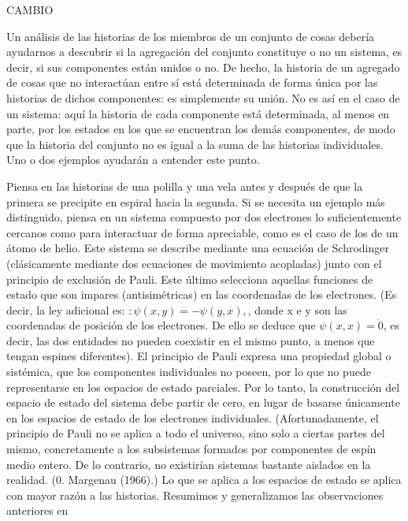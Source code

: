 \begin{justifying}
    \pagebreak

    \begin{center}
        CAMBIO
    \end{center}

    Un análisis de las historias de los miembros de un conjunto de cosas debería
    ayudarnos a descubrir si la agregación del conjunto constituye o no un
    sistema, es decir, si sus componentes están unidos o no. De hecho, la
    historia de un agregado de cosas que no interactúan entre sí está determinada de forma única
    por las historias de dichos componentes: es simplemente su unión. No es así en el
    caso de un sistema: aquí la historia de cada componente está determinada, al
    menos en parte, por los estados en los que se encuentran los demás componentes, de modo que la historia del
    conjunto no es igual a la suma de las historias individuales. Uno
    o dos ejemplos ayudarán a entender este punto.

    Piensa en las historias de una polilla y una vela antes y después de que
    la primera se precipite en espiral hacia la segunda. Si se necesita un ejemplo más distinguido,
    piensa en un sistema compuesto por dos electrones lo suficientemente cercanos como para interactuar
    de forma apreciable, como es el caso de los de un átomo de helio. Este sistema se
    describe mediante una ecuación de Schrodinger (clásicamente mediante dos ecuaciones de movimiento acopladas) junto con el principio de exclusión de Pauli. Este último
    selecciona aquellas funciones de estado que son impares (antisimétricas) en las coordenadas de los electrones. (Es decir, la ley adicional es: $: \psi(x, y) = -\psi(y, x),$,
    donde x e y son las coordenadas de posición de los electrones. De ello se deduce
    que $\psi(x, x) = \dot{0}$, es decir, las dos entidades no pueden coexistir en el mismo punto,
    a menos que tengan espines diferentes). El principio de Pauli expresa una propiedad global
    o sistémica, que los componentes individuales no poseen,
    por lo que no puede representarse en los espacios de estado parciales. Por lo tanto,
    la construcción del espacio de estado del sistema debe partir de
    cero, en lugar de basarse únicamente en los espacios de estado de los electrones individuales.
    (Afortunadamente, el principio de Pauli no se aplica a todo el
    universo, sino solo a ciertas partes del mismo, concretamente a los subsistemas formados
    por componentes de espín medio entero. De lo contrario, no existirían sistemas bastante
    aislados en la realidad. (0. Margenau (1966).) Lo que se aplica a los espacios de estado
    se aplica con mayor razón a las historias.
    Resumimos y generalizamos las observaciones anteriores en


\end{justifying}
